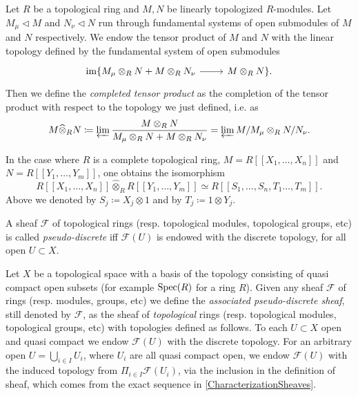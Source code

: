 \begin{defn}
	Let $R$ be a topological ring and $M, N$ be linearly topologized $R$-modules.
	Let $M_\mu \triangleleft M$ and $N_\nu \triangleleft N$ run through
	fundamental systems of open submodules of $M$ and $N$ respectively.
	We endow the tensor product of $M$ and $N$ with the linear topology
	defined by the fundamental system of open submodules
	\begin{equation*}
	\begin{tikzcd}
	\ima \{ M_\mu \otimes_R N + M \otimes_R N_\nu 
		\arrow[r, "", rightarrow] &
	M \otimes_R N \}
	.\end{tikzcd}
	\end{equation*}
	Then we define the \emph{completed tensor product} as the completion
	of the tensor product with respect to the topology we
	just defined, i.e$.$ as 
	\begin{equation*}
		M \widehat{\otimes}_R N \coloneqq 
		\varprojlim \frac{M \otimes_R N}{M_\mu \otimes_R N +
		M \otimes_R N_\nu} =
		\varprojlim M / M_\mu \otimes_R N / N_\nu
	.\end{equation*}
\end{defn}


\begin{rem}[]
	In the case where $R$ is a complete topological ring,
	$M = R [\![ X_1, \ldots, X_{ n } ]\!]$
	and $N = R [\![ Y_1, \ldots, Y_{ m } ]\!]$,
	one obtains the isomorphism
	\begin{equation*}
		R [\![ X_1, \ldots, X_{ n } ]\!] \widehat{\otimes}_{R}
		R [\![ Y_1, \ldots, Y_{ m } ]\!] \simeq
		R [\![ S_1, \ldots, S_n, T_1 \ldots, T_{ m } ]\!]
	.\end{equation*}
	Above we denoted by $S_j \coloneqq X_j \otimes 1$
	and by $T_j \coloneqq 1 \otimes Y_j$.
\end{rem}


\begin{defn}
	A sheaf $\mathcal{F}$ of topological rings (resp$.$ topological modules, topological groups, etc)
	is called \emph{pseudo-discrete} iff
	$\mathcal{F}(U)$ is endowed with the discrete topology,
	for all open $U \subset X$.
\end{defn}


\begin{defn}\label{defn:AssociatePDSheaf}
	Let $X$ be a topological space with a basis of the topology
	consisting of quasi compact open subsets (for example $\operatorname{Spec}(R)$
	for a ring $R$).
	Given any sheaf $\mathcal{F}$ of rings (resp$.$ modules, groups, etc)
	we define the \emph{associated pseudo-discrete sheaf},
	still denoted by $\mathcal{F}$, as the sheaf
	of \emph{topological} rings (resp$.$ topological modules, topological groups, etc)
	with topologies defined as follows.
	To each $U \subset X$ open and quasi compact we endow
	$\mathcal{F}(U)$ with the discrete topology.
	For an arbitrary open $U = \bigcup_{i \in I} U_i$, where $U_i$ are all
	quasi compact open, we endow $\mathcal{F}(U)$ with the
	induced topology from $\Pi_{i \in I} \mathcal{F}(U_i)$, via the inclusion
	in the definition of sheaf, which comes from the exact sequence
	in \cref{CharacterizationSheaves}.
\end{defn}


